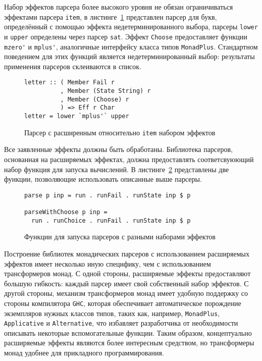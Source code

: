Набор эффектов парсера более высокого уровня не обязан ограничиваться эффектами парсера \lstinline{item}, в листинге~\ref{listing:ExtEffectsMpus} представлен парсер для букв, определённый с помощью эффекта недетерминированного выбора, парсеры \lstinline{lower} и \lstinline{upper} определены через парсер \lstinline{sat}. Эффект \lstinline{Choose} предоставляет функции \lstinline{mzero'} и \lstinline{mplus'}, аналогичные интерфейсу класса типов \lstinline{MonadPlus}. Стандартном поведением для этих функций является недетерминированный выбор: результаты применения парсеров склеиваются в список.

\begin{figure}[t]
\begin{lstlisting}
letter :: ( Member Fail r
          , Member (State String) r
          , Member (Choose) r
          ) => Eff r Char
letter = lower `mplus'` upper
\end{lstlisting}
\caption{Парсер с расширенным относительно \lstinline{item} набором эффектов}
\label{listing:ExtEffectsMpus}
\end{figure}

Все заявленные эффекты должны быть обработаны. Библиотека парсеров, основанная на расширяемых эффектах, должна предоставлять соответсвуюющий набор функция для запуска вычислений. В листинге~\ref{listing:ExtEffectsRunners} представлены две функции, позволяющие использовать описанные выше парсеры.

\begin{figure}[t]
\begin{lstlisting}
parse p inp = run . runFail . runState inp $ p

parseWithChoose p inp =
  run . runChoice . runFail . runState inp $ p
\end{lstlisting}
\caption{Функции для запуска парсеров с разными наборами эффектов}
\label{listing:ExtEffectsRunners}
\end{figure}

Построение библиотек монадических парсеров с использованием расширяемых эффектов имеет несколько иную специфику, чем с использованием трансформеров монад. С одной стороны, расширяемые эффекты предоставляют большую гибкость: каждый парсер имеет свой собственный набор эффектов. С другой стороны, механизм трансформеров монад имеет удобную поддержку со стороны компилятора \lstinline{GHC}, которая обеспечивает автоматическое порождение экземпляров нужных классов типов, таких как, например, \lstinline{MonadPlus}, \lstinline{Applicative} и \lstinline{Alternative}, что избавляет разработчика от необходимости описывать некоторые вспомогательные функции. Таким образом, концептуально расширяемые эффекты являются более интересным средством, но трансформеры монад удобнее для прикладного программирования.

